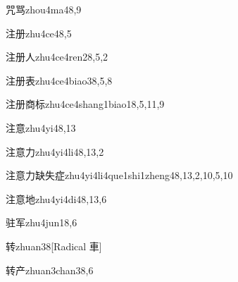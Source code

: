 \begin{verbete}{咒骂}{zhou4ma4}{8,9}
\end{verbete}

\begin{verbete}{注册}{zhu4ce4}{8,5}
\end{verbete}

\begin{verbete}{注册人}{zhu4ce4ren2}{8,5,2}
\end{verbete}

\begin{verbete}{注册表}{zhu4ce4biao3}{8,5,8}
\end{verbete}

\begin{verbete}{注册商标}{zhu4ce4shang1biao1}{8,5,11,9}
\end{verbete}

\begin{verbete}{注意}{zhu4yi4}{8,13}
\end{verbete}

\begin{verbete}{注意力}{zhu4yi4li4}{8,13,2}
\end{verbete}

\begin{verbete}{注意力缺失症}{zhu4yi4li4que1shi1zheng4}{8,13,2,10,5,10}
\end{verbete}

\begin{verbete}{注意地}{zhu4yi4di4}{8,13,6}
\end{verbete}

\begin{verbete}{驻军}{zhu4jun1}{8,6}
\end{verbete}

\begin{verbete}{转}{zhuan3}{8}[Radical 車]
\end{verbete}

\begin{verbete}{转产}{zhuan3chan3}{8,6}
\end{verbete}

